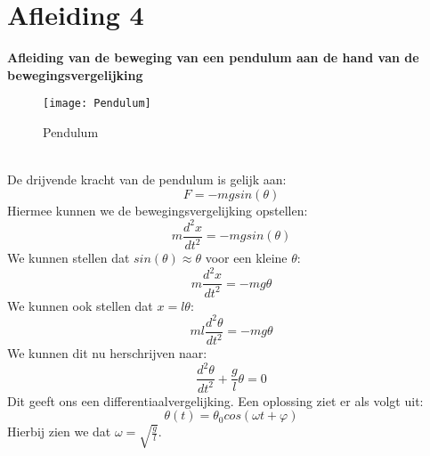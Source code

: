 \documentclass[a4paper,kul]{kulakarticle} %
\begin{document}
\section{Afleiding 4}
\textbf{Afleiding van de beweging van een pendulum aan de hand van de bewegingsvergelijking}
\begin{figure}[htbp]
	\centering
	\texttt{[image: Pendulum]}
	\caption[Pendulum]{Pendulum}
	\label{fig:pendulum}
\end{figure} \\
De drijvende kracht van de pendulum is gelijk aan:
\begin{equation*}
	F = -mg sin(\theta)
\end{equation*}
Hiermee kunnen we de bewegingsvergelijking opstellen:
\begin{equation*}
	m\frac{d^2x}{dt^2} = -mgsin(\theta)
\end{equation*}
We kunnen stellen dat $sin(\theta) \approx \theta$ voor een kleine $\theta$:
\begin{equation*}
	m\frac{d^2x}{dt^2} = -mg\theta
\end{equation*}
We kunnen ook stellen dat $x = l\theta$:
\begin{equation*}
	ml\frac{d^2\theta}{dt^2} = -mg\theta
\end{equation*}
We kunnen dit nu herschrijven naar:
\begin{equation*}
	\frac{d^2\theta}{dt^2} +\frac{g}{l}\theta = 0
\end{equation*}
Dit geeft ons een differentiaalvergelijking. Een oplossing ziet er als volgt uit:
\begin{equation*}
	\theta (t) = \theta_0 cos(\omega t +\varphi)
\end{equation*}
Hierbij zien we dat $\omega = \sqrt{\frac{g}{l}}$.
\newpage
\end{document}
